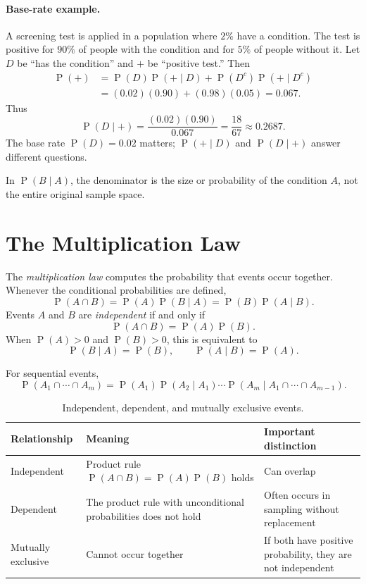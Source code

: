 \documentclass[11pt]{article}
\newcommand{\Pp}{\operatorname{P}}
\begin{document}
\paragraph{Base-rate example.}
A screening test is applied in a population where $2\%$ have a condition.  The
test is positive for $90\%$ of people with the condition and for $5\%$ of people
without it.  Let $D$ be ``has the condition'' and $+$ be ``positive test.''
Then
\begin{align*}
\Pp(+)&=\Pp(D)\Pp(+\mid D)+\Pp(D^c)\Pp(+\mid D^c)\\
&=(0.02)(0.90)+(0.98)(0.05)=0.067.
\end{align*}
Thus
\[
\Pp(D\mid +)=\frac{(0.02)(0.90)}{0.067}
=\frac{18}{67}\approx0.2687.
\]
The base rate $\Pp(D)=0.02$ matters; $\Pp(+\mid D)$ and $\Pp(D\mid +)$ answer
different questions.

\begin{keybox}
In $\Pp(B\mid A)$, the denominator is the size or probability of the condition
$A$, not the entire original sample space.
\end{keybox}

\section{The Multiplication Law}\label{sec:multiplication}
The \emph{multiplication law} computes the probability that events occur
together.  Whenever the conditional probabilities are defined,
\[
\Pp(A\cap B)=\Pp(A)\Pp(B\mid A)=\Pp(B)\Pp(A\mid B).
\]
Events $A$ and $B$ are \emph{independent} if and only if
\[
\Pp(A\cap B)=\Pp(A)\Pp(B).
\]
When $\Pp(A)>0$ and $\Pp(B)>0$, this is equivalent to
\[
\Pp(B\mid A)=\Pp(B),\qquad \Pp(A\mid B)=\Pp(A).
\]

For sequential events,
\[
\Pp(A_1\cap\cdots\cap A_m)=\Pp(A_1)\Pp(A_2\mid A_1)\cdots
\Pp(A_m\mid A_1\cap\cdots\cap A_{m-1}).
\]

\begin{table}[ht]
\centering
\caption{Independent, dependent, and mutually exclusive events.}\label{tab:independent-dependent}
\begin{tabularx}{\textwidth}{@{}lYY@{}}
\toprule
Relationship & Meaning & Important distinction \\
\midrule
Independent & Product rule $\Pp(A\cap B)=\Pp(A)\Pp(B)$ holds & Can overlap \\
Dependent & The product rule with unconditional probabilities does not hold & Often occurs in sampling without replacement \\
Mutually exclusive & Cannot occur together & If both have positive probability, they are not independent \\
\bottomrule
\end{tabularx}
\end{table}
\end{document}
